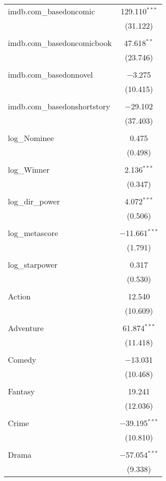 \begin{table}[!htbp]
\begin{tabular}{@{\extracolsep{5pt}}lc}
 imdb.com\_basedoncomic & 129.110$^{***}$ \\ 
  & (31.122) \\ 
  & \\ 
 imdb.com\_basedoncomicbook & 47.618$^{**}$ \\ 
  & (23.746) \\ 
  & \\ 
 imdb.com\_basedonnovel & $-$3.275 \\ 
  & (10.415) \\ 
  & \\ 
 imdb.com\_basedonshortstory & $-$29.102 \\ 
  & (37.403) \\ 
  & \\ 
 log\_Nominee & 0.475 \\ 
  & (0.498) \\ 
  & \\ 
 log\_Winner & 2.136$^{***}$ \\ 
  & (0.347) \\ 
  & \\ 
 log\_dir\_power & 4.072$^{***}$ \\ 
  & (0.506) \\ 
  & \\ 
 log\_metascore & $-$11.661$^{***}$ \\ 
  & (1.791) \\ 
  & \\ 
 log\_starpower & 0.317 \\ 
  & (0.530) \\ 
  & \\ 
 Action & 12.540 \\ 
  & (10.609) \\ 
  & \\ 
 Adventure & 61.874$^{***}$ \\ 
  & (11.418) \\ 
  & \\ 
 Comedy & $-$13.031 \\ 
  & (10.468) \\ 
  & \\ 
 Fantasy & 19.241 \\ 
  & (12.036) \\ 
  & \\ 
 Crime & $-$39.195$^{***}$ \\ 
  & (10.810) \\ 
  & \\ 
 Drama & $-$57.054$^{***}$ \\ 
  & (9.338) \\ 

\end{tabular}
\end{table}
